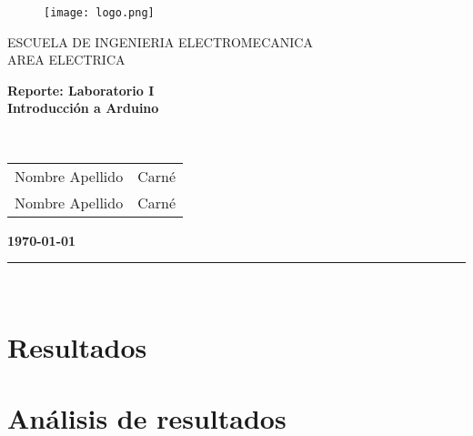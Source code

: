 \documentclass[12pt,letterpaper]{report}
\begin{document}
\begin{titlepage}

\begin{center}
\vspace*{-0.5in}
\begin{figure}[htb]
\begin{center}
\texttt{[image: logo.png]}
\end{center}
\end{figure}
\vspace*{0.4in}
\begin{Large}
ESCUELA DE INGENIERIA ELECTROMECANICA\\
\vspace*{0.15in}
AREA ELECTRICA\\
\vspace*{0.8in}
\end{Large}
\vspace*{0.2in}
\begin{Large}
\textbf{Reporte: Laboratorio I} \\
\vspace*{0.1in}
\textbf{Introducción a Arduino}
\end{Large}
\vspace*{0.3in}\\
\begin{center}
    \begin{tabular}{c|c}
        Nombre Apellido & Carné  \\
        Nombre Apellido & Carné
    \end{tabular}
\end{center}
\vspace*{2.5in}
\begin{Large}
\textbf{\today}\\
\end{Large}
\rule{80mm}{0.1mm}\\
\vspace*{0.1in}
\end{center}

\end{titlepage}

\tableofcontents


\section{Resultados}

\section{Análisis de resultados}
\end{document}
